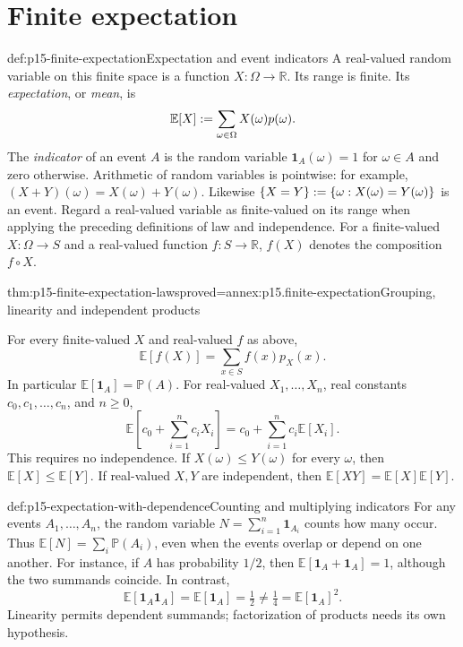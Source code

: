 \section{Finite expectation}
\label{sec:p15-finite-expectation}

\begin{hbdefinition}{def:p15-finite-expectation}{Expectation and event indicators}
A real-valued random variable on this finite space is a function
\(X:\Omega\to\mathbb R\). Its range is finite. Its
\emph{expectation}, or \emph{mean}, is
\[
 \mathbb E[X]\mathrel{:=}\sum_{\omega\in\Omega}X(\omega)p(\omega).
\]
The \emph{indicator} of an event \(A\) is the random variable
\(\mathbf1_A(\omega)=1\) for \(\omega\in A\) and zero otherwise.
Arithmetic of random variables is pointwise: for example,
\((X+Y)(\omega)=X(\omega)+Y(\omega)\).
Likewise \(\{X=Y\}\mathrel{:=}\{\omega:X(\omega)=Y(\omega)\}\) is an
event. Regard a real-valued variable as finite-valued on its range when
applying the preceding definitions of law and independence.
For a finite-valued \(X:\Omega\to S\) and a real-valued function
\(f:S\to\mathbb R\), \(f(X)\) denotes the composition \(f\circ X\).
\end{hbdefinition}

\begin{hbtheorem}{thm:p15-finite-expectation-laws}{proved=annex:p15.finite-expectation}{Grouping, linearity and independent products}
\par\nobreak
For every finite-valued \(X\) and real-valued \(f\) as above,
\[
 \mathbb E[f(X)]=\sum_{x\in S}f(x)p_X(x).
\]
In particular \(\mathbb E[\mathbf1_A]=\mathbb P(A)\).
For real-valued \(X_1,\ldots,X_n\), real constants
\(c_0,c_1,\ldots,c_n\), and \(n\geq0\),
\[
 \mathbb E\left[c_0+\sum_{i=1}^n c_iX_i\right]
       =c_0+\sum_{i=1}^n c_i\mathbb E[X_i].
\]
This requires no independence. If \(X(\omega)\leq Y(\omega)\) for
every \(\omega\), then \(\mathbb E[X]\leq\mathbb E[Y]\).
If real-valued \(X,Y\) are independent, then
\(\mathbb E[XY]=\mathbb E[X]\mathbb E[Y]\).
\end{hbtheorem}

\begin{hbexample}{def:p15-expectation-with-dependence}{Counting and multiplying indicators}
For any events \(A_1,\ldots,A_n\), the random variable
\(N=\sum_{i=1}^n\mathbf1_{A_i}\) counts how many occur. Thus
\(\mathbb E[N]=\sum_i\mathbb P(A_i)\), even when the events overlap
or depend on one another. For instance, if \(A\) has probability
\(1/2\), then \(\mathbb E[\mathbf1_A+\mathbf1_A]=1\), although
the two summands coincide. In contrast,
\[
 \mathbb E[\mathbf1_A\mathbf1_A]=\mathbb E[\mathbf1_A]=\tfrac12
 \ne\tfrac14=\mathbb E[\mathbf1_A]^2.
\]
Linearity permits dependent summands; factorization of products needs its
own hypothesis.
\end{hbexample}

